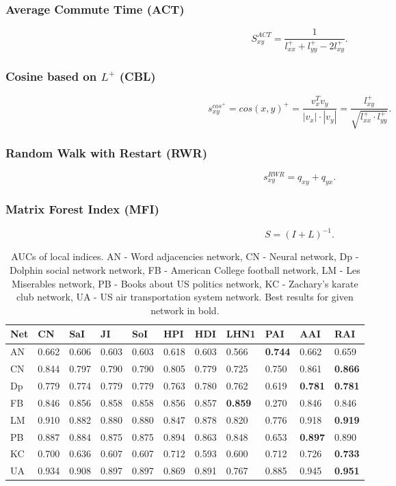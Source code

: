 \documentclass{llncs}
\begin{document}
\subsubsection{Average Commute Time (ACT)}
%
$$S_{xy}^{ACT} = \frac{1}{l_{xx}^{+} + l_{yy}^{+} - 2l_{xy}^{+}}.$$
%
\subsubsection{Cosine based on $L^+$ (CBL)}
%
$$s_{xy}^{cos^{+}} = cos(x, y)^{+} = \frac{v_x^T v_y}{|v_x| \cdot |v_y|} = \frac{l_{xy}^{+}}{\sqrt{l_{xx}^{+}\cdot l_{yy}^{+}}}.$$
%
\subsubsection{Random Walk with Restart (RWR)}
%
$$s_{xy}^{RWR} = q_{xy} + q_{yx}.$$
%
\subsubsection{Matrix Forest Index (MFI)}
%
$$S = (I + L)^{-1}.$$
%
\setlength{\tabcolsep}{5pt}
\renewcommand{\arraystretch}{1.5}
\begin{table}
\begin{center}
\caption{AUCs of local indices. AN - Word adjacencies network\cite{adjnoun-net}, CN - Neural network\cite{celneur-net}, Dp - Dolphin social network network\cite{dolph-net}, FB - American College football network\cite{foot-net}, LM - Les Miserables network\cite{lesmis-net}, PB - Books about US politics network\cite{polbook-net}, KC - Zachary's karate club network\cite{karate-net}, UA - US air transportation system network\cite{usair-net}. Best results for given network in bold.}
\begin{tabular}{| l | l | l | l | l | l | l | l | l | l | l |}
\hline
Net & CN & SaI & JI & SoI & HPI & HDI & LHN1 & PAI & AAI & RAI \\ \hline
AN & 0.662 & 0.606 & 0.603 & 0.603 & 0.618 & 0.603 & 0.566 & \textbf{0.744} & 0.662 & 0.659 \\ \hline
CN & 0.844 & 0.797 & 0.790 & 0.790 & 0.805 & 0.779 & 0.725 & 0.750 & 0.861 & \textbf{0.866} \\ \hline
Dp & 0.779 & 0.774 & 0.779 & 0.779 & 0.763 & 0.780 & 0.762 & 0.619 & \textbf{0.781} & \textbf{0.781} \\ \hline
FB & 0.846 & 0.856 & 0.858 & 0.858 & 0.856 & 0.857 & \textbf{0.859} & 0.270 & 0.846 & 0.846 \\ \hline
LM & 0.910 & 0.882 & 0.880 & 0.880 & 0.847 & 0.878 & 0.820 & 0.776 & 0.918 & \textbf{0.919} \\ \hline
PB & 0.887 & 0.884 & 0.875 & 0.875 & 0.894 & 0.863 & 0.848 & 0.653 & \textbf{0.897} & 0.890 \\ \hline
KC & 0.700 & 0.636 & 0.607 & 0.607 & 0.712 & 0.593 & 0.600 & 0.712 & 0.726 & \textbf{0.733} \\ \hline
UA & 0.934 & 0.908 & 0.897 & 0.897 & 0.869 & 0.891 & 0.767 & 0.885 & 0.945 & \textbf{0.951} \\ 
\hline
\end{tabular}
\end{center}
\end{table}
\end{document}
